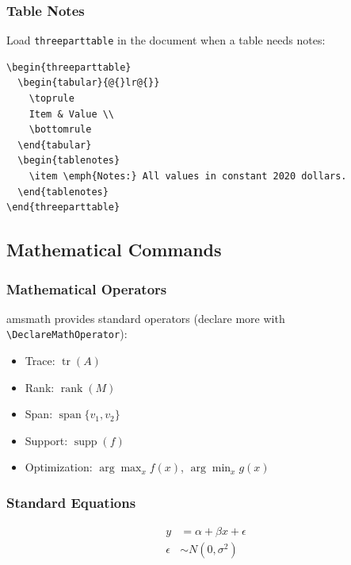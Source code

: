 \subsubsection{Table Notes}

Load \texttt{threeparttable} in the document when a table needs notes:

\begin{verbatim}
\begin{threeparttable}
  \begin{tabular}{@{}lr@{}}
    \toprule
    Item & Value \\
    \bottomrule
  \end{tabular}
  \begin{tablenotes}
    \item \emph{Notes:} All values in constant 2020 dollars.
  \end{tablenotes}
\end{threeparttable}
\end{verbatim}

\subsection{Mathematical Commands}

\subsubsection{Mathematical Operators}

amsmath provides standard operators (declare more with \verb|\DeclareMathOperator|):

\begin{itemize}
\item Trace: $\operatorname{tr}(A)$
\item Rank: $\operatorname{rank}(M)$
\item Span: $\operatorname{span}\{v_1, v_2\}$
\item Support: $\operatorname{supp}(f)$
\item Optimization: $\arg\max_{x} f(x)$, $\arg\min_{x} g(x)$
\end{itemize}

\subsubsection{Standard Equations}

\begin{align}
  y &= \alpha + \beta x + \epsilon \\
  \epsilon &\sim N(0, \sigma^2)
\end{align}

